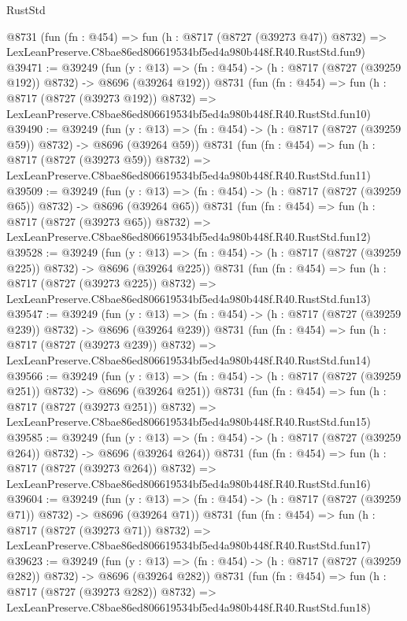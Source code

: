 \begin{lexlean}{RustStd}
\begin{coremodule}
    @8731
    (fun (fn : @454) =>
    fun (h : @8717 (@8727 (@39273 @47)) @8732) =>
    LexLeanPreserve.C8bae86ed806619534bf5ed4a980b448f.R40.RustStd.fun9)
@39471 := @39249
    (fun (y : @13) => (fn : @454) -> (h : @8717 (@8727 (@39259 @192)) @8732) -> @8696 (@39264 @192))
    @8731
    (fun (fn : @454) =>
    fun (h : @8717 (@8727 (@39273 @192)) @8732) =>
    LexLeanPreserve.C8bae86ed806619534bf5ed4a980b448f.R40.RustStd.fun10)
@39490 := @39249
    (fun (y : @13) => (fn : @454) -> (h : @8717 (@8727 (@39259 @59)) @8732) -> @8696 (@39264 @59))
    @8731
    (fun (fn : @454) =>
    fun (h : @8717 (@8727 (@39273 @59)) @8732) =>
    LexLeanPreserve.C8bae86ed806619534bf5ed4a980b448f.R40.RustStd.fun11)
@39509 := @39249
    (fun (y : @13) => (fn : @454) -> (h : @8717 (@8727 (@39259 @65)) @8732) -> @8696 (@39264 @65))
    @8731
    (fun (fn : @454) =>
    fun (h : @8717 (@8727 (@39273 @65)) @8732) =>
    LexLeanPreserve.C8bae86ed806619534bf5ed4a980b448f.R40.RustStd.fun12)
@39528 := @39249
    (fun (y : @13) => (fn : @454) -> (h : @8717 (@8727 (@39259 @225)) @8732) -> @8696 (@39264 @225))
    @8731
    (fun (fn : @454) =>
    fun (h : @8717 (@8727 (@39273 @225)) @8732) =>
    LexLeanPreserve.C8bae86ed806619534bf5ed4a980b448f.R40.RustStd.fun13)
@39547 := @39249
    (fun (y : @13) => (fn : @454) -> (h : @8717 (@8727 (@39259 @239)) @8732) -> @8696 (@39264 @239))
    @8731
    (fun (fn : @454) =>
    fun (h : @8717 (@8727 (@39273 @239)) @8732) =>
    LexLeanPreserve.C8bae86ed806619534bf5ed4a980b448f.R40.RustStd.fun14)
@39566 := @39249
    (fun (y : @13) => (fn : @454) -> (h : @8717 (@8727 (@39259 @251)) @8732) -> @8696 (@39264 @251))
    @8731
    (fun (fn : @454) =>
    fun (h : @8717 (@8727 (@39273 @251)) @8732) =>
    LexLeanPreserve.C8bae86ed806619534bf5ed4a980b448f.R40.RustStd.fun15)
@39585 := @39249
    (fun (y : @13) => (fn : @454) -> (h : @8717 (@8727 (@39259 @264)) @8732) -> @8696 (@39264 @264))
    @8731
    (fun (fn : @454) =>
    fun (h : @8717 (@8727 (@39273 @264)) @8732) =>
    LexLeanPreserve.C8bae86ed806619534bf5ed4a980b448f.R40.RustStd.fun16)
@39604 := @39249
    (fun (y : @13) => (fn : @454) -> (h : @8717 (@8727 (@39259 @71)) @8732) -> @8696 (@39264 @71))
    @8731
    (fun (fn : @454) =>
    fun (h : @8717 (@8727 (@39273 @71)) @8732) =>
    LexLeanPreserve.C8bae86ed806619534bf5ed4a980b448f.R40.RustStd.fun17)
@39623 := @39249
    (fun (y : @13) => (fn : @454) -> (h : @8717 (@8727 (@39259 @282)) @8732) -> @8696 (@39264 @282))
    @8731
    (fun (fn : @454) =>
    fun (h : @8717 (@8727 (@39273 @282)) @8732) =>
    LexLeanPreserve.C8bae86ed806619534bf5ed4a980b448f.R40.RustStd.fun18)

\end{coremodule}
\end{lexlean}
